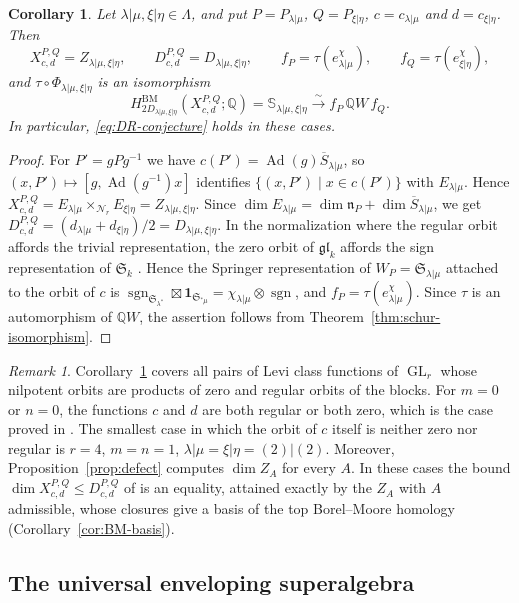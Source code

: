 \documentclass[11pt,a4paper]{amsart}
\newtheorem{corollary}[theorem]{Corollary}
\theoremstyle{definition}
\theoremstyle{remark}
\newtheorem{remark}[theorem]{Remark}
\newcommand{\Q}{\mathbb Q}
\newcommand{\N}{\mathcal N}
\newcommand{\bS}{\mathbb S}
\newcommand{\BM}{\mathrm{BM}}
\newcommand{\sgn}{\operatorname{sgn}}
\newcommand{\Ad}{\operatorname{Ad}}
\newcommand{\lm}{\lambda|\mu}
\newcommand{\xh}{\xi|\eta}
\numberwithin{equation}{section}
\begin{document}
\begin{corollary}\label{cor:DR-conjecture}
Let $\lm,\xh\in\Lambda$, and put $P=P_{\lm}$, $Q=P_{\xh}$,
$c=c_{\lm}$ and $d=c_{\xh}$. Then
$$
X^{P,Q}_{c,d}=Z_{\lm,\xh},\qquad D^{P,Q}_{c,d}=D_{\lm,\xh},\qquad
f_P=\tau(e^\chi_{\lm}),\qquad f_Q=\tau(e^\chi_{\xh}),
$$
and $\tau\circ\Phi_{\lm,\xh}$ is an isomorphism
$$
H^{\BM}_{2D_{\lm,\xh}}(X^{P,Q}_{c,d};\Q)=\bS_{\lm,\xh}
\xrightarrow{\ \sim\ }f_P\,\Q W\,f_Q .
$$
In particular, \eqref{eq:DR-conjecture} holds in these cases.
\end{corollary}
\begin{proof}
For $P'=gPg^{-1}$ we have $c(P')=\Ad(g)\overline S_{\lm}$, so
$(x,P')\mapsto[g,\Ad(g^{-1})x]$ identifies
$\{(x,P')\mid x\in c(P')\}$ with $E_{\lm}$. Hence
$X^{P,Q}_{c,d}=E_{\lm}\times_{\N_r}E_{\xh}=Z_{\lm,\xh}$. Since
$\dim E_{\lm}=\dim\mathfrak n_P+\dim\overline S_{\lm}$, we get
$D^{P,Q}_{c,d}=(d_{\lm}+d_{\xh})/2=D_{\lm,\xh}$.
In the normalization where the regular orbit affords the trivial
representation, the zero orbit of $\mathfrak{gl}_k$ affords the sign
representation of $\mathfrak S_k$ \cite[Section~1.5.3]{YunLec}. Hence the
Springer representation of $W_P=\mathfrak S_{\lm}$ attached to the orbit
of $c$ is
$\sgn_{\mathfrak S_{\lambda^*}}\boxtimes\mathbf1_{\mathfrak S_{{}^*\mu}}
=\chi_{\lm}\otimes\sgn$, and $f_P=\tau(e^\chi_{\lm})$. Since $\tau$ is an
automorphism of $\Q W$, the assertion follows from
Theorem~\ref{thm:schur-isomorphism}.
\end{proof}

\begin{remark}\label{rem:DR-conjecture}
Corollary~\ref{cor:DR-conjecture} covers all pairs of Levi class
functions of $\operatorname{GL}_r$ whose nilpotent orbits are products of
zero and regular orbits of the blocks. For $m=0$ or $n=0$, the functions
$c$ and $d$ are both regular or both zero, which is the case proved in
\cite{DR}. The smallest case in which the
orbit of $c$ itself is neither zero nor regular is $r=4$, $m=n=1$,
$\lm=\xh=(2)|(2)$. Moreover,
Proposition~\ref{prop:defect} computes $\dim Z_A$ for every $A$. In
these cases the bound $\dim X^{P,Q}_{c,d}\le D^{P,Q}_{c,d}$ of
\cite[Corollary~2.6]{DR04} is an equality, attained exactly by the
$Z_A$ with $A$ admissible, whose closures give a basis of the top
Borel--Moore homology (Corollary~\ref{cor:BM-basis}).
\end{remark}


\subsection{The universal enveloping superalgebra}
\label{sec:enveloping}
\end{document}
